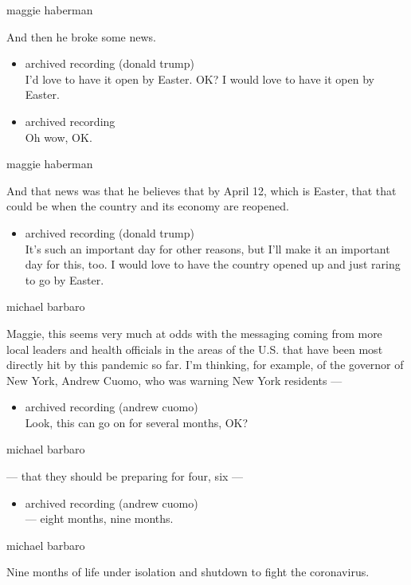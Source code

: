 maggie haberman

And then he broke some news.

\begin{itemize}
\item
  archived recording (donald trump)\\
  I'd love to have it open by Easter. OK? I would love to have it open
  by Easter.
\item
  archived recording\\
  Oh wow, OK.
\end{itemize}

maggie haberman

And that news was that he believes that by April 12, which is Easter,
that that could be when the country and its economy are reopened.

\begin{itemize}
\tightlist
\item
  archived recording (donald trump)\\
  It's such an important day for other reasons, but I'll make it an
  important day for this, too. I would love to have the country opened
  up and just raring to go by Easter.
\end{itemize}

michael barbaro

Maggie, this seems very much at odds with the messaging coming from more
local leaders and health officials in the areas of the U.S. that have
been most directly hit by this pandemic so far. I'm thinking, for
example, of the governor of New York, Andrew Cuomo, who was warning New
York residents ---

\begin{itemize}
\tightlist
\item
  archived recording (andrew cuomo)\\
  Look, this can go on for several months, OK?
\end{itemize}

michael barbaro

--- that they should be preparing for four, six ---

\begin{itemize}
\tightlist
\item
  archived recording (andrew cuomo)\\
  --- eight months, nine months.
\end{itemize}

michael barbaro

Nine months of life under isolation and shutdown to fight the
coronavirus.

